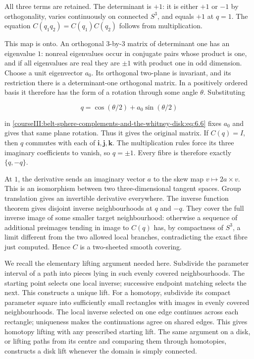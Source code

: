 All three terms are retained. The determinant is \(+1\): it is either \(+1\) or \(-1\) by orthogonality, varies continuously on connected \(S^3\), and equals \(+1\) at \(q=1\). The equation
\(C(q_1q_2)=C(q_1)C(q_2)\) follows from multiplication.

This map is onto. An orthogonal \(3\)-by-\(3\) matrix of determinant one has an eigenvalue \(1\): nonreal eigenvalues occur in conjugate pairs whose product is one, and if all eigenvalues are real they are \(\pm1\) with product one in odd dimension. Choose a unit eigenvector \(a_0\). Its orthogonal two-plane is invariant, and its restriction there is a determinant-one orthogonal matrix. In a positively ordered basis it therefore has the form of a rotation through some angle \(\theta\). Substituting

\begin{equation}
q=\cos(\theta/2)+a_0\sin(\theta/2)
\label{courseIII:belt-sphere-complements-and-the-whitney-disk:eq:6.7}
\end{equation}

in \eqref{courseIII:belt-sphere-complements-and-the-whitney-disk:eq:6.6} fixes \(a_0\) and gives that same plane rotation. Thus it gives the original matrix. If \(C(q)=I\), then \(q\) commutes with each of \(\mathbf i,\mathbf j,\mathbf k\). The multiplication rules force its three imaginary coefficients to vanish, so \(q=\pm1\). Every fibre is therefore exactly \(\{q,-q\}\).

At \(1\), the derivative sends an imaginary vector \(a\) to the skew map \(v\mapsto2a\times v\). This is an isomorphism between two three-dimensional tangent spaces. Group translation gives an invertible derivative everywhere. The inverse function theorem gives disjoint inverse neighbourhoods at \(q\) and \(-q\). They cover the full inverse image of some smaller target neighbourhood: otherwise a sequence of additional preimages tending in image to \(C(q)\) has, by compactness of \(S^3\), a limit different from the two allowed local branches, contradicting the exact fibre just computed. Hence \(C\) is a two-sheeted smooth covering.

We recall the elementary lifting argument needed here. Subdivide the parameter interval of a path into pieces lying in such evenly covered neighbourhoods. The starting point selects one local inverse; successive endpoint matching selects the next. This constructs a unique lift. For a homotopy, subdivide its compact parameter square into sufficiently small rectangles with images in evenly covered neighbourhoods. The local inverse selected on one edge continues across each rectangle; uniqueness makes the continuations agree on shared edges. This gives homotopy lifting with any prescribed starting lift. The same argument on a disk, or lifting paths from its centre and comparing them through homotopies, constructs a disk lift whenever the domain is simply connected.

